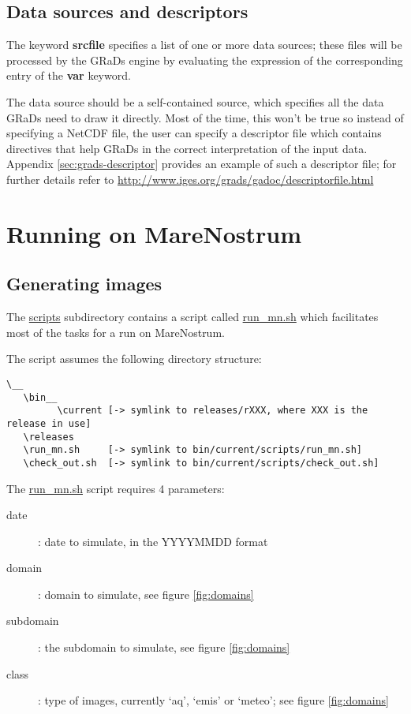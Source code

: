 \documentclass[11pt]{article}
\newcommand{\grads}{GRaDs}
\newcommand{\mn}{MareNostrum}
\newcommand{\kw}[1]{{\textbf{#1}}}
\begin{document}
\subsection{Data sources and descriptors}
The keyword \kw{srcfile} specifies a list of one or more data sources; these files will be processed by the \grads{} engine  by evaluating the expression of the corresponding entry of the \kw{var} keyword. 

The data source should be a self-contained source, which specifies all the data \grads{} need to draw it directly. Most of the time, this won't be true so instead of specifying a NetCDF file, the user can specify a descriptor file which contains directives that help \grads{} in the correct interpretation of the input data. Appendix \ref{sec:grads-descriptor} provides an example of such a descriptor file; for further details refer to \url{http://www.iges.org/grads/gadoc/descriptorfile.html}

\section{Running on MareNostrum}

\subsection{Generating images}

The \url{scripts} subdirectory contains a script called \url{run_mn.sh} which facilitates most of the tasks for a run on \mn{}.

The script assumes the following directory structure: 
\begin{verbatim}
\__
   \bin__
         \current [-> symlink to releases/rXXX, where XXX is the release in use]
   \releases 
   \run_mn.sh     [-> symlink to bin/current/scripts/run_mn.sh]
   \check_out.sh  [-> symlink to bin/current/scripts/check_out.sh]
\end{verbatim}
 
The \url{run_mn.sh} script requires 4 parameters: 
\begin{description}
\item[date]: date to simulate, in the YYYYMMDD format 
\item[domain]: domain to simulate, see figure \ref{fig:domains}
\item[subdomain]: the subdomain to simulate,  see figure \ref{fig:domains}
\item[class]: type of images, currently `aq', `emis' or `meteo'; see figure \ref{fig:domains}
\end{description}
\end{document}
